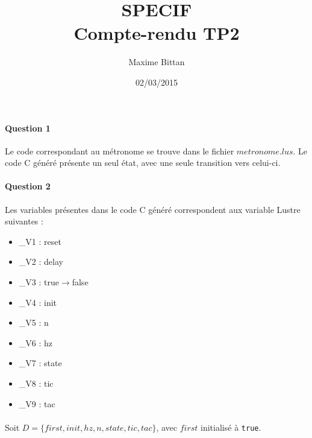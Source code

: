 \documentclass[a4paper, 11pt]{article}
\begin{document}
 
\title{SPECIF\\Compte-rendu TP2}
\author{Maxime Bittan}
\date{02/03/2015}
 
\maketitle
 
\paragraph{Question 1}
Le code correspondant au métronome se trouve dans le fichier $metronome.lus$. Le code C généré présente un seul état, avec une seule transition vers celui-ci.

\paragraph{Question 2}
Les variables présentes dans le code C généré correspondent aux variable Lustre suivantes : 
\begin{itemize}
  \item \_V1 : reset
  \item \_V2 : delay
  \item \_V3 : true$\rightarrow$false
  \item \_V4 : init
  \item \_V5 : n
  \item \_V6 : hz
  \item \_V7 : state
  \item \_V8 : tic
  \item \_V9 : tac
\end{itemize}

\paragraph{}
Soit $D = \{first, init, hz, n, state, tic, tac\}$, avec $first$ initialisé à \texttt{true}.
\end{document}
